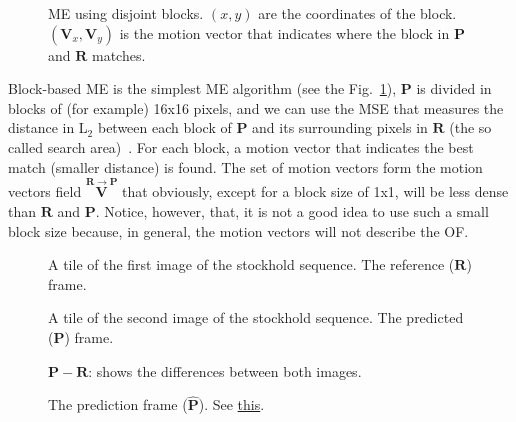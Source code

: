 \begin{figure}
  \centering
  \caption{ME using disjoint blocks. $(x,y)$ are the coordinates of
    the block. $({\mathbf V}_x, {\mathbf V}_y)$ is the motion vector
    that indicates where the block in ${\mathbf P}$ and ${\mathbf R}$
    matches.}
  \label{fig:simple}
\end{figure}

Block-based ME is the simplest ME algorithm (see the
Fig.~\ref{fig:simple}), ${\mathbf P}$ is divided in blocks of (for
example) 16x16 pixels, and we can use the MSE that measures the
distance in L$_2$ between each block of ${\mathbf P}$ and its
surrounding pixels in ${\mathbf R}$ (the so called search
area)~\cite{zhu2000new}. For each block, a motion vector that
indicates the best match (smaller distance) is found. The set of
motion vectors form the motion vectors field $\overset{{\mathbf
    R}\rightarrow {\mathbf P}}{\mathbf V}$ that obviously, except for
a block size of 1x1, will be less dense than ${\mathbf R}$ and
${\mathbf P}$. Notice, however, that, it is not a good idea to use
such a small block size because, in general, the motion vectors will
not describe the OF.

\begin{figure}
  \centering
  \caption{A tile of the first image of the stockhold sequence. The reference (${\mathbf R}$) frame.}
  \label{fig:R_block}
\end{figure}

\begin{figure}
  \centering
  \caption{A tile of the second image of the stockhold sequence. The predicted (${\mathbf P}$) frame.}
  \label{fig:P_block}
\end{figure}

\begin{figure}
  \centering
  \caption{${\mathbf P} - {\mathbf R}$: shows the differences between both images.}
  \label{fig:RP_block}
\end{figure}

\begin{figure}
  \centering
  \caption{The prediction frame (${\hat{\mathbf P}}$). See \href{https://github.com/Sistemas-Multimedia/Sistemas-Multimedia.github.io/blob/master/milestones/10-ME/full_search_block_ME.ipynb}{this}.}
  \label{fig:hat_P_block}
\end{figure}


